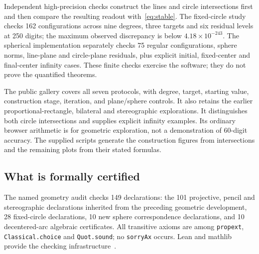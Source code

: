 \documentclass[11pt,a4paper]{article}
\theoremstyle{remark}\newtheorem{remark}[theorem]{Remark}
\begin{document}
Independent high-precision checks construct the lines and circle intersections first and then compare the resulting readout with~\eqref{eq:stable}. The fixed-circle study checks 162 configurations across nine degrees, three targets and six residual levels at 250 digits; the maximum observed discrepancy is below $4.18\times10^{-243}$. The spherical implementation separately checks 75 regular configurations, sphere norms, line-plane and circle-plane residuals, plus explicit initial, fixed-center and final-center infinity cases. These finite checks exercise the software; they do not prove the quantified theorems.

The public gallery covers all seven protocols, with degree, target, starting value, construction stage, iteration, and plane/sphere controls. It also retains the earlier proportional-rectangle, bilateral and stereographic explorations. It distinguishes both circle intersections and supplies explicit infinity examples. Its ordinary browser arithmetic is for geometric exploration, not a demonstration of 60-digit accuracy. The supplied scripts generate the construction figures from intersections and the remaining plots from their stated formulas.

\subsection{What is formally certified}\label{sec:formal}
The named geometry audit checks 149 declarations: the 101 projective, pencil and stereographic declarations inherited from the preceding geometric development, 28 fixed-circle declarations, 10 new sphere correspondence declarations, and 10 decentered-arc algebraic certificates. All transitive axioms are among \texttt{propext}, \texttt{Classical.choice} and \texttt{Quot.sound}; no \texttt{sorryAx} occurs. Lean and mathlib provide the checking infrastructure~\cite{lean4,mathlib}.
\end{document}
